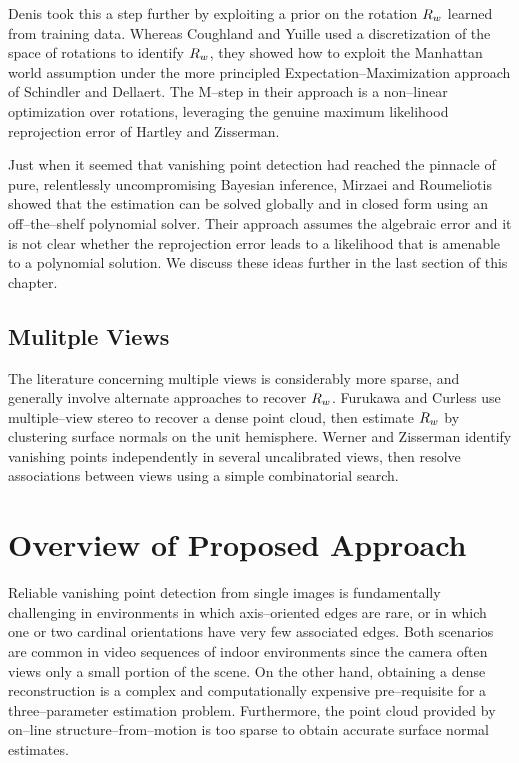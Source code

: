 Denis \etal \cite{Denis08} took this a step further by exploiting a
prior on the rotation $\SceneR$ learned from training data. Whereas
Coughland and Yuille used a discretization of the space of rotations
to identify $\SceneR$, they showed how to exploit the Manhattan world
assumption under the more principled Expectation--Maximization
approach of Schindler and Dellaert. The M--step in their approach is a
non--linear optimization over rotations, leveraging the genuine
maximum likelihood reprojection error of Hartley and Zisserman.

Just when it seemed that vanishing point detection had reached the
pinnacle of pure, relentlessly uncompromising Bayesian inference,
Mirzaei and Roumeliotis \cite{Mirzaei11} showed that the estimation
can be solved globally and in closed form using an off--the--shelf
polynomial solver. Their approach assumes the algebraic error and it
is not clear whether the reprojection error leads to a likelihood that
is amenable to a polynomial solution. We discuss these ideas further
in the last section of this chapter.

\subsection{Mulitple Views}

The literature concerning multiple views is considerably more sparse,
and generally involve alternate approaches to recover
$\SceneR$. Furukawa and Curless \cite{Furukawa09} use multiple--view
stereo to recover a dense point cloud, then estimate $\SceneR$ by
clustering surface normals on the unit hemisphere. Werner and
Zisserman \cite{Werner02} identify vanishing points independently in
several uncalibrated views, then resolve associations between views
using a simple combinatorial search.

\section{Overview of Proposed Approach}

Reliable vanishing point detection from single images is fundamentally
challenging in environments in which axis--oriented edges are rare, or
in which one or two cardinal orientations have very few associated
edges. Both scenarios are common in video sequences of indoor
environments since the camera often views only a small portion of the
scene. On the other hand, obtaining a dense reconstruction is a
complex and computationally expensive pre--requisite for a
three--parameter estimation problem. Furthermore, the point cloud
provided by on--line structure--from--motion is too sparse to obtain
accurate surface normal estimates.

